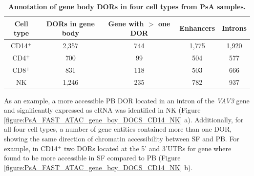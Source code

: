 
\begin{table}[htbp]
\centering
\begin{tabular}{@{} c c c c c}
\toprule
\textbf{Cell type} & \textbf{DORs in gene body} &  \textbf{Gene with $>$ one DOR} &\textbf{Enhancers} & \textbf{Introns} \\
\midrule
\midrule
CD14$^+$ & 2,357 & 744 & 1,775 & 1,920 \\
CD4$^+$ & 700 & 99 & 504 & 577 \\
CD8$^+$ & 831 & 118 & 503 & 666 \\
NK   & 1,246 & 235 & 782 & 937 \\   
\bottomrule
\end{tabular}
\medskip %
\caption[Annotation of gene body DORs in four cell types from PsA samples.]{\textbf{Annotation of gene body DORs in four cell types from PsA samples.}}
\label{tab:PSA_DOCs_gene_body}
\end{table}

As an example, a more accessible PB DOR located in an intron of the \textit{VAV3} gene and significantly expressed as eRNA was identified in NK (Figure \ref{figure:PsA_FAST_ATAC_gene_boy_DOCS_CD14_NK} a). Additionally, for all four cell types, a number of gene entities contained more than one DOR, showing the same direction of chromatin accessibility between SF and PB. For example, in CD14$^+$ two DORs located at the 5' and 3'UTRs for  gene where found to be more accessible in SF compared to PB (Figure \ref{figure:PsA_FAST_ATAC_gene_boy_DOCS_CD14_NK} b). 

